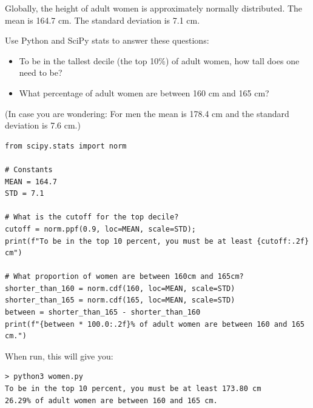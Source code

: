 \begin{Exercise}[title={SciPy Stats}, label=scipy_ppf]

Globally,  the height of adult women is approximately normally distributed. The mean is 164.7 cm. The standard deviation is 7.1 cm.

Use Python and SciPy stats to answer these questions: 

\begin{itemize}
\item To be in the tallest decile (the top 10\%) of adult women,  how tall does one need to be? 

\item What percentage of adult women are between 160 cm and 165 cm?

\end{itemize}

(In case you are wondering: For men the mean is 178.4 cm and the standard deviation is 7.6 cm.)

\end{Exercise}
\begin{Answer}[ref=scipy_ppf]

\begin{verbatim}
from scipy.stats import norm

# Constants
MEAN = 164.7 
STD = 7.1

# What is the cutoff for the top decile?
cutoff = norm.ppf(0.9, loc=MEAN, scale=STD);
print(f"To be in the top 10 percent, you must be at least {cutoff:.2f} cm")

# What proportion of women are between 160cm and 165cm?
shorter_than_160 = norm.cdf(160, loc=MEAN, scale=STD)
shorter_than_165 = norm.cdf(165, loc=MEAN, scale=STD)
between = shorter_than_165 - shorter_than_160
print(f"{between * 100.0:.2f}% of adult women are between 160 and 165 cm.")
\end{verbatim}

When run,  this will give you:

\begin{verbatim}
> python3 women.py
To be in the top 10 percent, you must be at least 173.80 cm
26.29% of adult women are between 160 and 165 cm.
\end{verbatim}

\end{Answer}
